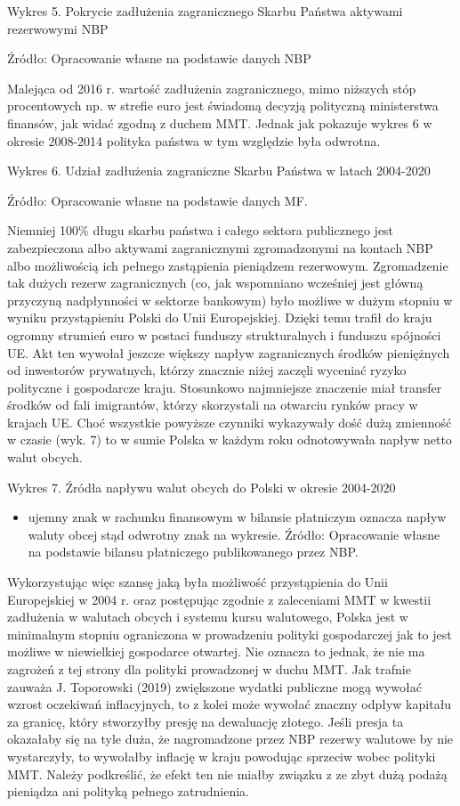 \documentclass[
]{book}
\providecommand{\tightlist}{%
  \setlength{\itemsep}{0pt}\setlength{\parskip}{0pt}}
\begin{document}
Wykres 5. Pokrycie zadłużenia zagranicznego Skarbu Państwa aktywami rezerwowymi NBP

Źródło: Opracowanie własne na podstawie danych NBP

Malejąca od 2016 r. wartość zadłużenia zagranicznego, mimo niższych stóp procentowych np. w strefie euro jest świadomą decyzją polityczną ministerstwa finansów, jak widać zgodną z duchem MMT. Jednak jak pokazuje wykres 6 w okresie 2008-2014 polityka państwa w tym względzie była odwrotna.

Wykres 6. Udział zadłużenia zagraniczne Skarbu Państwa w latach 2004-2020

Źródło: Opracowanie własne na podstawie danych MF.

Niemniej 100\% długu skarbu państwa i całego sektora publicznego jest zabezpieczona albo aktywami zagranicznymi zgromadzonymi na kontach NBP albo możliwością ich pełnego zastąpienia pieniądzem rezerwowym.
Zgromadzenie tak dużych rezerw zagranicznych (co, jak wspomniano wcześniej jest główną przyczyną nadpłynności w sektorze bankowym) było możliwe w dużym stopniu w wyniku przystąpieniu Polski do Unii Europejskiej. Dzięki temu trafił do kraju ogromny strumień euro w postaci funduszy strukturalnych i funduszu spójności UE. Akt ten wywołał jeszcze większy napływ zagranicznych środków pieniężnych od inwestorów prywatnych, którzy znacznie niżej zaczęli wyceniać ryzyko polityczne i gospodarcze kraju. Stosunkowo najmniejsze znaczenie miał transfer środków od fali imigrantów, którzy skorzystali na otwarciu rynków pracy w krajach UE. Choć wszystkie powyższe czynniki wykazywały dość dużą zmienność w czasie (wyk. 7) to w sumie Polska w każdym roku odnotowywała napływ netto walut obcych.

Wykres 7. Źródła napływu walut obcych do Polski w okresie 2004-2020

\begin{itemize}
\tightlist
\item
  ujemny znak w rachunku finansowym w bilansie płatniczym oznacza napływ waluty obcej stąd odwrotny znak na wykresie.
  Źródło: Opracowanie własne na podstawie bilansu płatniczego publikowanego przez NBP.
\end{itemize}

Wykorzystując więc szansę jaką była możliwość przystąpienia do Unii Europejskiej w 2004 r. oraz postępując zgodnie z zaleceniami MMT w kwestii zadłużenia w walutach obcych i systemu kursu walutowego, Polska jest w minimalnym stopniu ograniczona w prowadzeniu polityki gospodarczej jak to jest możliwe w niewielkiej gospodarce otwartej. Nie oznacza to jednak, że nie ma zagrożeń z tej strony dla polityki prowadzonej w duchu MMT. Jak trafnie zauważa J. Toporowski (2019) zwiększone wydatki publiczne mogą wywołać wzrost oczekiwań inflacyjnych, to z kolei może wywołać znaczny odpływ kapitału za granicę, który stworzyłby presję na dewaluację złotego. Jeśli presja ta okazałaby się na tyle duża, że nagromadzone przez NBP rezerwy walutowe by nie wystarczyły, to wywołałby inflację w kraju powodując sprzeciw wobec polityki MMT. Należy podkreślić, że efekt ten nie miałby związku z ze zbyt dużą podażą pieniądza ani polityką pełnego zatrudnienia.
\end{document}
